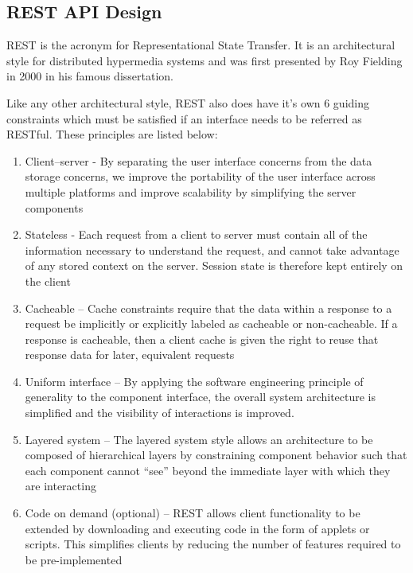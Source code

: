 \subsection{REST API Design}
REST is the acronym for Representational State Transfer. It is an architectural style for distributed hypermedia systems and was first presented by Roy Fielding in 2000 in his famous dissertation.

Like any other architectural style, REST also does have it’s own 6 guiding constraints which must be satisfied if an interface needs to be referred as RESTful. These principles are listed below:
\begin{enumerate}
  \item Client–server - By separating the user interface concerns from the data storage concerns, we improve the portability of the user interface across multiple platforms and improve scalability by simplifying the server components
  \item Stateless - Each request from a client to server must contain all of the information necessary to understand the request, and cannot take advantage of any stored context on the server. Session state is therefore kept entirely on the client
  \item Cacheable – Cache constraints require that the data within a response to a request be implicitly or explicitly labeled as cacheable or non-cacheable. If a response is cacheable, then a client cache is given the right to reuse that response data for later, equivalent requests
  \item Uniform interface – By applying the software engineering principle of generality to the component interface, the overall system architecture is simplified and the visibility of interactions is improved.
  \item Layered system – The layered system style allows an architecture to be composed of hierarchical layers by constraining component behavior such that each component cannot ``see'' beyond the immediate layer with which they are interacting
  \item Code on demand (optional) – REST allows client functionality to be extended by downloading and executing code in the form of applets or scripts. This simplifies clients by reducing the number of features required to be pre-implemented
\end{enumerate}

